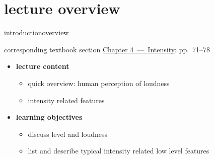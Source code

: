 




\subtitle{Module 4.0: Intensity}


	

    \section[overview]{lecture overview}
        \begin{frame}{introduction}{overview}
            \begin{block}{corresponding textbook section}
                    \href{http://ieeexplore.ieee.org/xpl/articleDetails.jsp?arnumber=6331121}{Chapter 4~---~Intensity}: pp.~71--78
            \end{block}

            \begin{itemize}
                \item   \textbf{lecture content}
                    \begin{itemize}
                        \item   quick overview: human perception of loudness 
                        \item   intensity related features
                    \end{itemize}
                \bigskip
                \item<2->   \textbf{learning objectives}
                    \begin{itemize}
                        \item   discuss level and loudness
                        \item   list and describe typical intensity related low level features
                    \end{itemize}
            \end{itemize}
        \end{frame}

